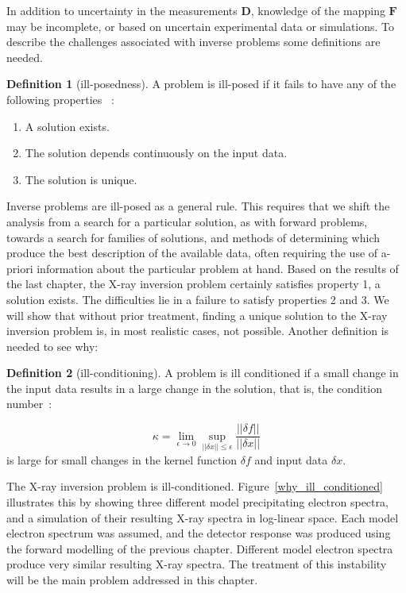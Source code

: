  In addition to uncertainty in the measurements $\mathbf{D}$, knowledge of the mapping $\mathbf{F}$ may be incomplete, or based on uncertain experimental data or simulations. To describe the challenges associated with inverse problems some definitions are needed.

\theoremstyle{definition}
\newtheorem{definition}{Definition}[section]
\begin{definition}[ill-posedness]
A problem is ill-posed if it fails to have any of the following properties~\citep{HADAMARD1902} : 
\begin{enumerate}
    \item A solution exists.
    \item The solution depends continuously on the input data.
    \item The solution is unique.
\end{enumerate}
\end{definition}

Inverse problems are ill-posed as a general rule. This requires that we shift the analysis from a search for a particular solution, as with forward problems, towards a search for families of solutions, and methods of determining which produce the best description of the available data, often requiring the use of a-priori information about the particular problem at hand. Based on the results of the last chapter, the X-ray inversion problem certainly satisfies property 1,  a solution exists. The difficulties lie in a failure to satisfy properties 2 and 3. We will show that without prior treatment, finding a unique solution to the X-ray inversion problem is, in most realistic cases, not possible. Another definition is needed to see why:

\begin{definition}[ill-conditioning]
A problem is ill conditioned if a small change in the input data results in a large change in the solution, that is, the condition number~\citep{Rice1966}:

$$\kappa = \lim_{\epsilon \to 0} \sup_{\vert\vert \delta x \vert \vert \leq \epsilon} \frac{\vert\vert \delta f \vert\vert}{\vert\vert \delta x \vert\vert}$$
is large for small changes in the kernel function $\delta f$ and input data $\delta x$.
\end{definition}

 The X-ray inversion problem is ill-conditioned. Figure~\ref{why_ill_conditioned} illustrates this by showing three different model precipitating electron spectra, and a simulation of their resulting X-ray spectra in log-linear space. Each model electron spectrum was assumed, and the detector response was produced using the forward modelling of the previous chapter. Different model electron spectra produce very similar resulting X-ray spectra. The treatment of this instability will be the main problem addressed in this chapter. 

